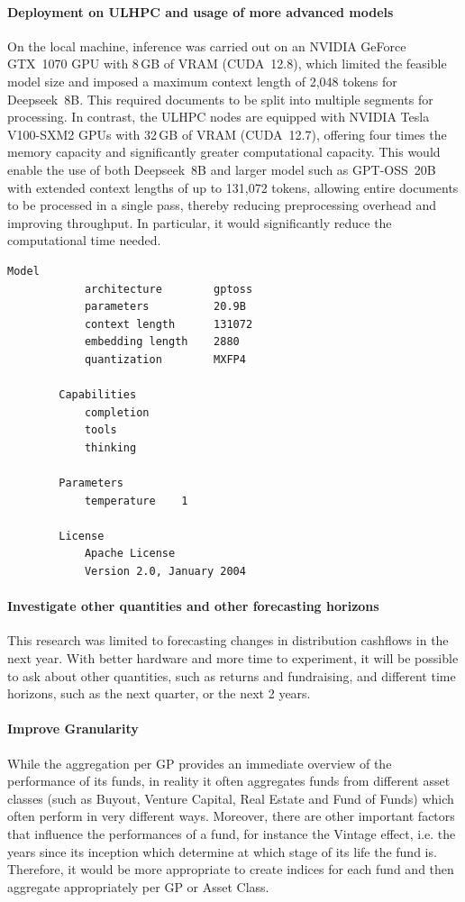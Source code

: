     \paragraph{Deployment on ULHPC and usage of more advanced models} On the local machine, inference was carried out on an NVIDIA GeForce GTX~1070 GPU with 8\,GB of VRAM (CUDA~12.8), which limited the feasible model size and imposed a maximum context length of 2,048 tokens for Deepseek~8B.
    This required documents to be split into multiple segments for processing.
    In contrast, the ULHPC nodes are equipped with NVIDIA Tesla V100-SXM2 GPUs with 32\,GB of VRAM  (CUDA~12.7), offering four times the memory capacity and significantly greater computational capacity.
    This would enable the use of both Deepseek~8B and larger model such as GPT-OSS~20B with extended context lengths of up to 131,072 tokens, allowing entire documents to be processed in a single pass, thereby reducing preprocessing overhead and improving throughput.
    In particular, it would significantly reduce the computational time needed.

    \begin{lstlisting}[style=cmd,label={lst:gptoss}]
        Model
            architecture        gptoss
            parameters          20.9B
            context length      131072
            embedding length    2880
            quantization        MXFP4

        Capabilities
            completion
            tools
            thinking

        Parameters
            temperature    1

        License
            Apache License
            Version 2.0, January 2004
    \end{lstlisting}

    \paragraph{Investigate other quantities and other forecasting horizons} This research was limited to forecasting changes in distribution cashflows in the next year.
    With better hardware and more time to experiment, it will be possible to ask about other quantities, such as returns and fundraising, and different time horizons, such as the next quarter, or the next 2 years.

    \paragraph{Improve Granularity} While the aggregation per GP provides an immediate overview of the performance of its funds, in reality it often aggregates funds from different asset classes (such as Buyout, Venture Capital, Real Estate and Fund of Funds) which often perform in very different ways.
    Moreover, there are other important factors that influence the performances of a fund, for instance the Vintage effect, i.e. the years since its inception which determine at which stage of its life the fund is.
    Therefore, it would be more appropriate to create indices for each fund and then aggregate appropriately per GP or Asset Class.

\appendix